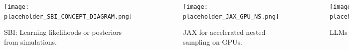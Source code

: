 \documentclass[aspectratio=169]{beamer}
\begin{document}
\begin{frame}
\begin{columns}[T]
            \begin{figure}
                \centering
                \texttt{[image: placeholder\_SBI\_CONCEPT\_DIAGRAM.png]}
                \caption{SBI: Learning likelihoods or posteriors from simulations.}
            \end{figure}
            \vspace{1em}
            \begin{figure}
                \centering
                \texttt{[image: placeholder\_JAX\_GPU\_NS.png]}
                \caption{JAX for accelerated nested sampling on GPUs.}
            \end{figure}
            \vspace{1em}
            \begin{figure}
                \centering
                \texttt{[image: placeholder\_LLM\_COSMOLOGY\_ASSISTANT.png]}
                \caption{LLMs as a co-pilot in cosmological research.}
            \end{figure}
    \end{columns}
\end{frame}
\end{document}
